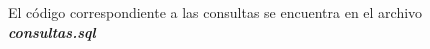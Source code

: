 El código correspondiente a las consultas se encuentra en el archivo \mbox{\textbf{\textit{consultas.sql}}}